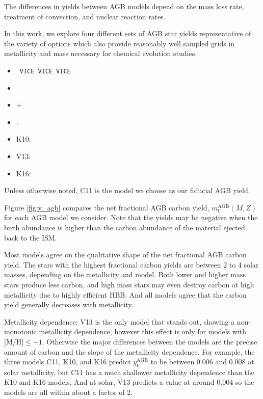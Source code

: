\documentclass[fleqn,usenatbib]{mnras}
\newcommand{\cristallo}{\citetalias{2011ApJS..197...17C}+\citetalias{2015ApJS..219...40C}}
\newcommand{\VICE}{\texttt{VICE}}
\begin{document}
The differences in yields between AGB models depend on the mass loss rate, treatment of convection, and nuclear reaction rates. 

In this work, we explore four different sets of AGB star yields representative of the variety of options which also provide reasonably well sampled grids in metallicity and mass necessary for chemical evolution studies.
\begin{itemize}
    \item~\VICE~\VICE~\VICE
    \item {}
    \item \cristallo
    \item \cite[C11][Hi]{2011ApJS..197...17C}: \citet{2011ApJS..197...17C, 2015ApJS..219...40C}
    \item K10: \citet{2010MNRAS.403.1413K}
    \item V13: \citet{2013MNRAS.431.3642V}
    \item K16: \citet{2016ApJ...825...26K}
\end{itemize}
Unless otherwise noted, C11 is the model we choose as our fiducial AGB yield. 

Figure \ref{fig:y_agb} compares the net fractional AGB carbon yield, $m_\text{C}^\text{AGB}(M, Z)$ for each AGB model we consider. Note that the yields may be negative when the birth abundance is higher than the carbon abundance of the material ejected back to the ISM. 

Most models agree on the qualitative shape of the net fractional AGB carbon yield. The stars with the highest fractional carbon yields are between 2 to 4 solar masses, depending on the metallicity and model. Both lower and higher mass stars produce less carbon, and high mass stars may even destroy carbon at high metallicity due to highly efficient HBB. And all models agree that the carbon yield generally decreases with metallicity. 


Metallicity dependence:
V13 is the only model that stands out, showing a non-monotonic metallicity dependence, however this effect is only for models with [M/H]$\leq -1$. Otherwise the major differences between the models are the precise amount of carbon and the slope of the metallicity dependence. For example, the three models C11, K10, and K16 predict $y_\text{C}^\text{AGB}$ to be between 0.006 and 0.008 at solar metallicity, but C11 has a much shallower metallicity dependence than the K10 and K16 models. And at solar, V13 predicts a value at around 0.004 so the models are all within about a factor of 2. 
\end{document}
